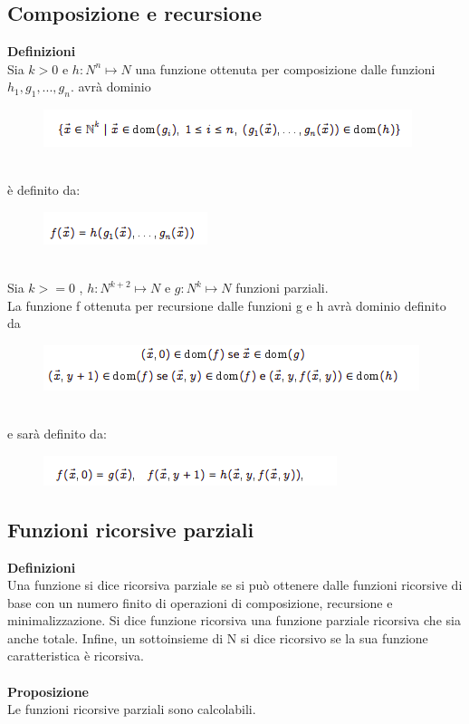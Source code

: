\subsection{Composizione e recursione}
\textbf{Definizioni}\\
Sia $k > 0$ e $h: N^n \mapsto N$ una funzione ottenuta per composizione dalle funzioni $h_1, g_1,...,g_n$. avrà dominio
\begin{figure}[htp]
    \centering
    \includegraphics[scale=0.7]{tesi_stile/img/f4cap8.png}
\end{figure}\\
è definito da:
\begin{figure}[htp]
    \centering
    \includegraphics[scale=0.7]{tesi_stile/img/f5cap8.png}
\end{figure}\\
Sia $k >= 0$ , $h: N^{k+2} \mapsto N$ e $g: N^k \mapsto N$  funzioni parziali.\\
La funzione f ottenuta per recursione dalle funzioni g e h avrà dominio definito da
\begin{figure}[htp]
    \centering
    \includegraphics[scale=0.7]{tesi_stile/img/f6cap8.png}
\end{figure}\\
e sarà definito da:
\begin{figure}[htp]
    \centering
    \includegraphics[scale=0.7]{tesi_stile/img/f7cap8.png}
\end{figure}
\newpage
\subsection{Funzioni ricorsive parziali}
\textbf{Definizioni}\\
Una funzione si dice ricorsiva parziale se si può ottenere dalle funzioni
ricorsive di base con un numero finito di operazioni di composizione,
recursione e minimalizzazione.
Si dice funzione ricorsiva una funzione parziale ricorsiva che sia anche
totale.
Infine, un sottoinsieme di N si dice ricorsivo se la sua funzione
caratteristica è ricorsiva.\\\\
\textbf{Proposizione}\\
Le funzioni ricorsive parziali sono calcolabili.
